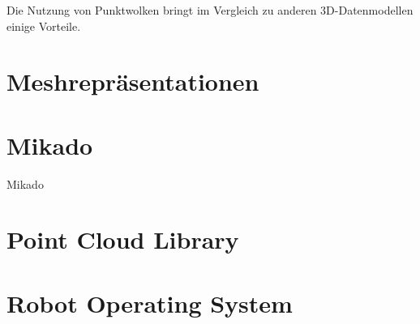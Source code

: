 Die Nutzung von Punktwolken bringt im Vergleich zu anderen 3D-Datenmodellen einige Vorteile.


\section{Meshrepräsentationen}


\section{Mikado}

Mikado \cite{mikado}


\section{Point Cloud Library}


\section{Robot Operating System}
